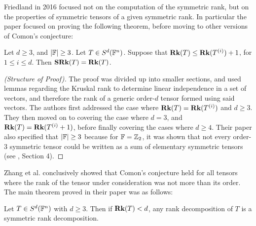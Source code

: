 \documentclass[../Lael_John_MasterThesis_Draft.tex]{subfiles}
\begin{document}
Friedland \cite{friedland_remarks_2016} in 2016 focused not on the computation of the symmetric rank, but on the properties of symmetric tensors of a given symmetric rank. In particular the paper focused on proving the following theorem, before moving to other versions of Comon's conjecture:
\begin{theorem}
	Let $d \geq 3$, and $|\mathbb{F}| \geq 3$. Let $T \in S^d(\mathbb{F}^n)$. Suppose that $\textbf{Rk}(T) \leq \textbf{Rk}(T^{(i)}) + 1$, for $1 \leq i \leq d$. Then $\textbf{SRk}(T) = \textbf{Rk}(T)$.
\end{theorem}
\begin{proof}[(Structure of Proof)]
	The proof was divided up into smaller sections, and used lemmas regarding the Kruskal rank to determine linear independence in a set of vectors, and therefore the rank of a generic order-$d$ tensor formed using said vectors. The authors first addressed the case where $\textbf{Rk}(T) = \textbf{Rk}(T^{(i)})$ and $d \geq 3$. They then moved on to covering the case where $d = 3$, and $\textbf{Rk}(T) = \textbf{Rk}(T^{(i)} + 1)$, before finally covering the cases where $d \geq 4$. Their paper also specified that $|\mathbb{F}| \geq 3$ because for $\mathbb{F} = \mathbb{Z}_2$, it was shown that not every order-$3$ symmetric tensor could be written as a sum of elementary symmetric tensors (see \cite{friedland_remarks_2016}, Section 4).
\end{proof}

Zhang et al. \cite{zhang_comons_2016} conclusively showed that Comon's conjecture held for all tensors where the rank of the tensor under consideration was not more than its order. The main theorem proved in their paper was as follows:
\begin{theorem}
	Let $T \in S^d(\mathbb{F}^n)$ with $d \geq 3$. Then if $\textbf{Rk}(T) < d$, any rank decomposition of $T$ is a symmetric rank decomposition.
\end{theorem}
\end{document}
